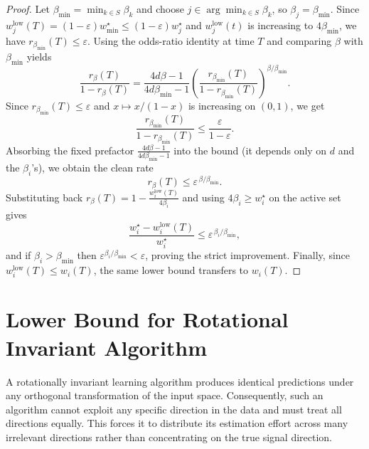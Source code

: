 \documentclass{article}
\theoremstyle{plain}
\theoremstyle{definition}
\theoremstyle{remark}
\begin{document}
{\begin{proof}
Let $\beta_{\min}=\min_{k\in S}\beta_k$ and choose $j\in\arg\min_{k\in S}\beta_k$, so $\beta_j=\beta_{\min}$.
Since $w_j^{\mathrm{low}}(T)=(1-\varepsilon)w_{\min}^\star\le (1-\varepsilon)w_j^\star$ and $w_j^{\mathrm{low}}(t)$ is increasing to $4\beta_{\min}$, we have $r_{\beta_{\min}}(T)\le \varepsilon$.
Using the odds-ratio identity at time $T$ and comparing $\beta$ with $\beta_{\min}$ yields
\[
\frac{r_\beta(T)}{1-r_\beta(T)}
=
\frac{4d\beta-1}{4d\beta_{\min}-1}
\left(\frac{r_{\beta_{\min}}(T)}{1-r_{\beta_{\min}}(T)}\right)^{\beta/\beta_{\min}}.
\]
Since $r_{\beta_{\min}}(T)\le \varepsilon$ and $x\mapsto x/(1-x)$ is increasing on $(0,1)$, we get
\[
\frac{r_{\beta_{\min}}(T)}{1-r_{\beta_{\min}}(T)}\le \frac{\varepsilon}{1-\varepsilon}.
\]
Absorbing the fixed prefactor $\frac{4d\beta-1}{4d\beta_{\min}-1}$ into the bound (it depends only on $d$ and the $\beta_i$'s), we obtain the clean rate
\[
r_\beta(T)\le \varepsilon^{\,\beta/\beta_{\min}}.
\]
Substituting back $r_\beta(T)=1-\frac{w_i^{\mathrm{low}}(T)}{4\beta_i}$ and using $4\beta_i\ge w_i^\star$ on the active set gives
\[
\frac{w_i^\star-w_i^{\mathrm{low}}(T)}{w_i^\star}\le \varepsilon^{\,\beta_i/\beta_{\min}},
\]
and if $\beta_i>\beta_{\min}$ then $\varepsilon^{\beta_i/\beta_{\min}}<\varepsilon$, proving the strict improvement. Finally, since $w_i^{\mathrm{low}}(T)\le w_i(T)$, the same lower bound transfers to $w_i(T)$.
\end{proof}




\section{Lower Bound for Rotational Invariant Algorithm}
A rotationally invariant learning algorithm produces identical predictions under any orthogonal transformation of the input space. Consequently, such an algorithm cannot exploit any specific direction in the data and must treat all directions equally. This forces it to distribute its estimation effort across many irrelevant directions rather than concentrating on the true signal direction. 

}
\end{document}
